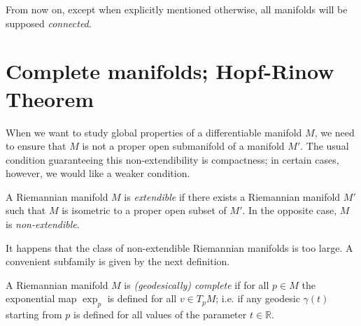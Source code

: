 From now on, except when explicitly mentioned otherwise, all manifolds will be
supposed \emph{connected}.

\section{Complete manifolds; Hopf-Rinow Theorem}

When we want to study global properties of a differentiable manifold $M$, we need
to ensure that $M$ is not a proper open submanifold of a manifold $M'$. The usual
condition guaranteeing this non-extendibility is compactness; in certain cases,
however, we would like a weaker condition.

\begin{definition}[extendible]
  \label{def:dc-ch7-2-1}
  A Riemannian manifold $M$ is \emph{extendible} if there exists a Riemannian manifold
  $M'$ such that $M$ is isometric to a proper open subset of $M'$. In the opposite
  case, $M$ is \emph{non-extendible}.
  
  It happens that the class of non-extendible Riemannian manifolds is too large. A
  convenient subfamily is given by the next definition.
\end{definition}

\begin{definition}
  \label{def:dc-ch7-2-2}
  \leanok
  A Riemannian manifold $M$ is \emph{(geodesically) complete} if for all $p\in M$ the
  exponential map $\exp_p$ is defined for all $v\in T_pM$; i.e. if any geodesic
  $\gamma(t)$ starting from $p$ is defined for all values of the parameter
  $t\in\mathbb{R}$.
\end{definition}


